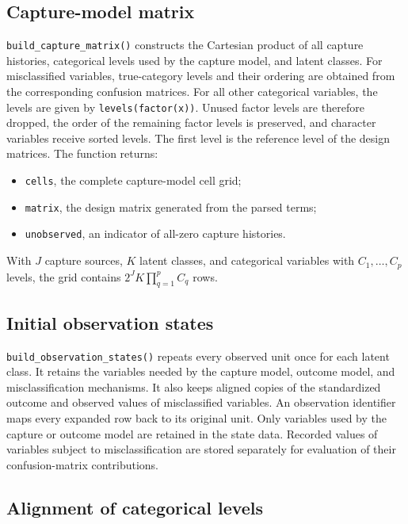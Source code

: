 \documentclass[11pt,letterpaper]{article}
\begin{document}
\subsection{Capture-model matrix}

\texttt{build\_capture\_matrix()} constructs the Cartesian product of all
capture histories, categorical levels used by the capture model, and latent
classes. For misclassified variables, true-category levels and their ordering
are obtained from the corresponding confusion matrices. For all other
categorical variables, the levels are given by \texttt{levels(factor(x))}.
Unused factor levels are therefore dropped, the order of the remaining factor
levels is preserved, and character variables receive sorted levels. The first
level is the reference level of the design matrices. The function returns:

\begin{itemize}
  \item \texttt{cells}, the complete capture-model cell grid;
  \item \texttt{matrix}, the design matrix generated from the parsed terms;
  \item \texttt{unobserved}, an indicator of all-zero capture histories.
\end{itemize}

With $J$ capture sources, $K$ latent classes, and categorical variables with
$C_1,\ldots,C_p$ levels, the grid contains
$2^J K\prod_{q=1}^p C_q$ rows.

\subsection{Initial observation states}

\texttt{build\_observation\_states()} repeats every observed unit once for
each latent class. It retains the variables needed by the capture model,
outcome model, and misclassification mechanisms. It also keeps aligned copies
of the standardized outcome and observed values of misclassified variables.
An observation identifier maps every expanded row back to its original unit.
Only variables used by the capture or outcome model are retained in the state
data. Recorded values of variables subject to misclassification are stored
separately for evaluation of their confusion-matrix contributions.

\subsection{Alignment of categorical levels}
\end{document}
